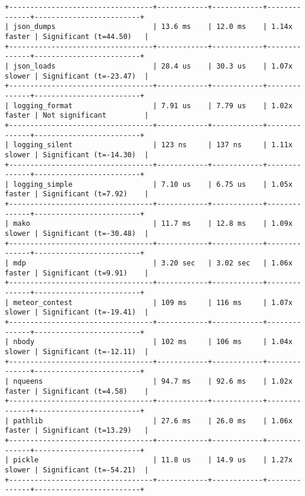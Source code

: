 \begin{code}
\begin{verbatim}
+----------------------------------+------------+------------+--------------+-------------------------+
| json_dumps                       | 13.6 ms    | 12.0 ms    | 1.14x faster | Significant (t=44.50)   |
+----------------------------------+------------+------------+--------------+-------------------------+
| json_loads                       | 28.4 us    | 30.3 us    | 1.07x slower | Significant (t=-23.47)  |
+----------------------------------+------------+------------+--------------+-------------------------+
| logging_format                   | 7.91 us    | 7.79 us    | 1.02x faster | Not significant         |
+----------------------------------+------------+------------+--------------+-------------------------+
| logging_silent                   | 123 ns     | 137 ns     | 1.11x slower | Significant (t=-14.30)  |
+----------------------------------+------------+------------+--------------+-------------------------+
| logging_simple                   | 7.10 us    | 6.75 us    | 1.05x faster | Significant (t=7.92)    |
+----------------------------------+------------+------------+--------------+-------------------------+
| mako                             | 11.7 ms    | 12.8 ms    | 1.09x slower | Significant (t=-30.48)  |
+----------------------------------+------------+------------+--------------+-------------------------+
| mdp                              | 3.20 sec   | 3.02 sec   | 1.06x faster | Significant (t=9.91)    |
+----------------------------------+------------+------------+--------------+-------------------------+
| meteor_contest                   | 109 ms     | 116 ms     | 1.07x slower | Significant (t=-19.41)  |
+----------------------------------+------------+------------+--------------+-------------------------+
| nbody                            | 102 ms     | 106 ms     | 1.04x slower | Significant (t=-12.11)  |
+----------------------------------+------------+------------+--------------+-------------------------+
| nqueens                          | 94.7 ms    | 92.6 ms    | 1.02x faster | Significant (t=4.58)    |
+----------------------------------+------------+------------+--------------+-------------------------+
| pathlib                          | 27.6 ms    | 26.0 ms    | 1.06x faster | Significant (t=13.29)   |
+----------------------------------+------------+------------+--------------+-------------------------+
| pickle                           | 11.8 us    | 14.9 us    | 1.27x slower | Significant (t=-54.21)  |
+----------------------------------+------------+------------+--------------+-------------------------+

\end{verbatim}
\end{code}
